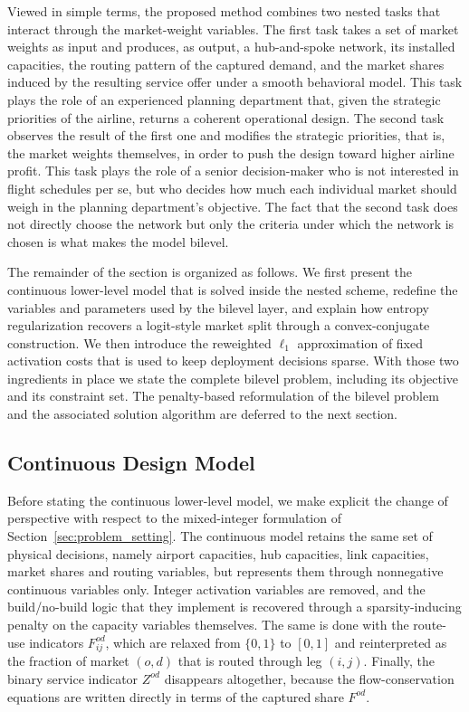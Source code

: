 Viewed in simple terms, the proposed method combines two nested tasks that interact through the market-weight variables. The first task takes a set of market weights as input and produces, as output, a hub-and-spoke network, its installed capacities, the routing pattern of the captured demand, and the market shares induced by the resulting service offer under a smooth behavioral model. This task plays the role of an experienced planning department that, given the strategic priorities of the airline, returns a coherent operational design. The second task observes the result of the first one and modifies the strategic priorities, that is, the market weights themselves, in order to push the design toward higher airline profit. This task plays the role of a senior decision-maker who is not interested in flight schedules per se, but who decides how much each individual market should weigh in the planning department's objective. The fact that the second task does not directly choose the network but only the criteria under which the network is chosen is what makes the model bilevel.

The remainder of the section is organized as follows. We first present the continuous lower-level model that is solved inside the nested scheme, redefine the variables and parameters used by the bilevel layer, and explain how entropy regularization recovers a logit-style market split through a convex-conjugate construction. We then introduce the reweighted $\ell_1$ approximation of fixed activation costs that is used to keep deployment decisions sparse. With those two ingredients in place we state the complete bilevel problem, including its objective and its constraint set. The penalty-based reformulation of the bilevel problem and the associated solution algorithm are deferred to the next section.

\subsection{Continuous Design Model}
\label{sec:continuous_design_model}
Before stating the continuous lower-level model, we make explicit the change of perspective with respect to the mixed-integer formulation of Section~\ref{sec:problem_setting}. The continuous model retains the same set of physical decisions, namely airport capacities, hub capacities, link capacities, market shares and routing variables, but represents them through nonnegative continuous variables only. Integer activation variables are removed, and the build/no-build logic that they implement is recovered through a sparsity-inducing penalty on the capacity variables themselves. The same is done with the route-use indicators $F_{ij}^{od}$, which are relaxed from $\{0,1\}$ to $[0,1]$ and reinterpreted as the fraction of market $(o,d)$ that is routed through leg $(i,j)$. Finally, the binary service indicator $Z^{od}$ disappears altogether, because the flow-conservation equations are written directly in terms of the captured share $F^{od}$.

